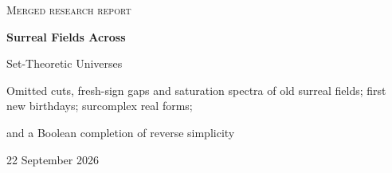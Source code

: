 \documentclass[11pt,letterpaper]{article}
\numberwithin{equation}{section}
\theoremstyle{definition}
\theoremstyle{remark}
\newcommand{\No}{\mathbf{No}}
\newcommand{\NoM}{\No^{M}}
\begin{document}
\hypersetup{pageanchor=false}
\begin{titlepage}
\centering
\vspace*{0.2in}
{\large\scshape Merged research report\par}
\vspace{0.35in}
{\Huge\bfseries\color{ink} Surreal Fields Across\par Set-Theoretic Universes\par}
\vspace{0.2in}
{\Large Omitted cuts, fresh-sign gaps and saturation spectra of old surreal
fields; first new birthdays; surcomplex real forms;\par
and a Boolean completion of reverse simplicity\par}
\vspace{0.25in}
{22 September 2026\par}
\vspace{0.25in}
\begin{minipage}{0.94\textwidth}
\begin{abstract}
Let $M\subseteq N$ be transitive universes of ZFC with the same ordinals, and
view the old surreal field $\NoM$ as a proper class of $N$. All sizes, types
and parameter sets are computed in $N$. For every uncountable cardinal
$\kappa$ of $N$, the ordered field $\NoM$ is $\kappa$-saturated exactly when
$N$ has no new ordinal-valued sequences of length less than $\kappa$. The
same condition is equivalent to interpolation of every set-sized cut with
just one side of size less than $\kappa$. The least length $\delta$ of a new
sequence is a regular cardinal of both universes. A fresh sequence of length
$\delta$ yields an omitted gap of exact cofinality pair $(\delta,\delta)$, by
three explicit constructions: a nested interval tree, an absolute interval
code with all ordinals as labels, and ordinal block codes of signs.


\end{abstract}
\end{minipage}
\end{titlepage}
\end{document}
